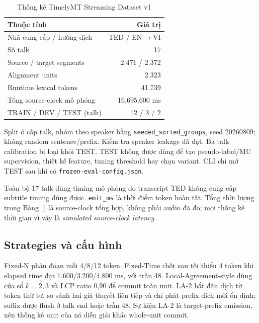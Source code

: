 \documentclass[conference]{IEEEtran}
\begin{document}
\begin{table}[t]
\caption{Thống kê TimelyMT Streaming Dataset v1}
\label{tab:dataset}
\centering
\footnotesize
\begin{tabular}{lr}
\toprule
Thuộc tính & Giá trị \\
\midrule
Nhà cung cấp / hướng dịch & TED / EN$\rightarrow$VI \\
Số talk & 17 \\
Source / target segments & 2.471 / 2.372 \\
Alignment units & 2.323 \\
Runtime lexical tokens & 41.739 \\
Tổng source-clock mô phỏng & 16.695.600 ms \\
TRAIN / DEV / TEST (talk) & 12 / 3 / 2 \\
\bottomrule
\end{tabular}
\end{table}

Split ở cấp talk, nhóm theo speaker bằng \texttt{seeded\_sorted\_groups}, seed 20260809; không random sentence/prefix. Kiểm tra speaker leakage đã đạt. Ba talk calibration bị loại khỏi TEST. TEST không được dùng để tạo pseudo-label/MU supervision, thiết kế feature, tuning threshold hay chọn variant. CLI chỉ mở TEST sau khi có \texttt{frozen-eval-config.json}.

Toàn bộ 17 talk dùng timing mô phỏng do transcript TED không cung cấp subtitle timing dùng được. \texttt{emit\_ms} là thời điểm token hoàn tất. Tổng thời lượng trong Bảng~\ref{tab:dataset} là source-clock tổng hợp, không phải audio đã đo; mọi thống kê thời gian vì vậy là \emph{simulated source-clock latency}.

\subsection{Strategies và cấu hình}
Fixed-N phân đoạn mỗi 4/8/12 token. Fixed-Time chốt sau tối thiểu 4 token khi elapsed time đạt 1.600/3.200/4.800 ms, với trần 48. Local-Agreement-style dùng cửa sổ $k=2,3$ và LCP ratio 0,90 để commit toàn unit. LA-2 bắt đầu dịch từ token thứ tư, so sánh hai giả thuyết liên tiếp và chỉ phát prefix đích mới ổn định; suffix được flush ở talk end hoặc trần 48. Sự kiện LA-2 là target-prefix emission, nên thống kê unit của nó diễn giải khác whole-unit commit.
\end{document}
